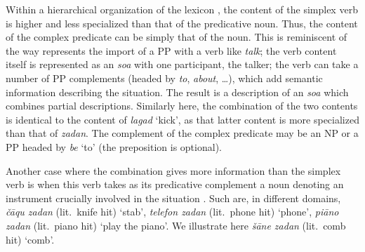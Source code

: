{
\z

Within a hierarchical organization of the lexicon , the content of the
simplex verb is higher and less specialized than that of the predicative noun. Thus, the content of
the complex predicate can be simply that of the noun. This is reminiscent of the way
\cite{Wechsler1995c} represents the import of a PP with a verb like \emph{talk}; the verb content
itself is represented as an \emph{soa} with one participant, the talker; the verb can take a number
of PP complements (headed by \emph{to}, \emph{about}, \ldots), which add semantic information describing the situation. The result is a description of an \emph{soa} which combines partial descriptions. Similarly here, the combination of the two contents is identical to the content of \emph{lagad} `kick', as that latter content is more specialized than that of \emph{zadan}. The complement of the complex predicate may be an NP or a PP headed by \emph{be} `to' (the preposition is optional).


\begin{exe}
\end{exe}

Another case where the combination gives more information than the simplex verb is when this verb takes as its predicative complement a noun denoting an instrument crucially involved in the situation \citep{bonami2010persian}. Such are, in different domains, \emph{\v c\=aqu zadan} (lit.\ knife hit) `stab', \emph{telefon zadan} (lit.\ phone hit) `phone', \emph{pi\=ano zadan} (lit.\ piano hit) `play the piano'. We illustrate here \emph{\v s\=ane zadan} (lit.\ comb hit) `comb'.    

}
